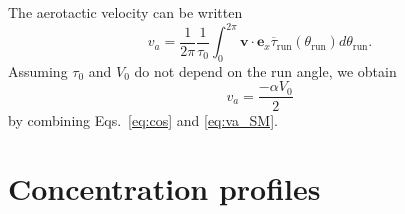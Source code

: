 \documentclass[aps,a4paper,twocolumn,10pt,pre,showpacs]{revtex4-2}
\begin{document}
The aerotactic velocity can be written 
\begin{equation}
\label{eq:va_SM}
    v_a = \dfrac{1}{2\pi} \dfrac{1}{\tau_0} \int_0^{2\pi}\mathbf{v}\cdot \mathbf{e}_x \overline{\tau}_\mathrm{run}(\theta_\mathrm{run})d\theta_\mathrm{run}.
\end{equation}
Assuming $\tau_0$ and $V_0$ do not depend on the run angle, we obtain
\begin{equation}
    v_a = \dfrac{-\alpha V_0}{2}
\end{equation}
by combining Eqs.~\eqref{eq:cos} and \eqref{eq:va_SM}.


\section{Concentration profiles}
\label{sec:SM_compil_profiles}
\end{document}
